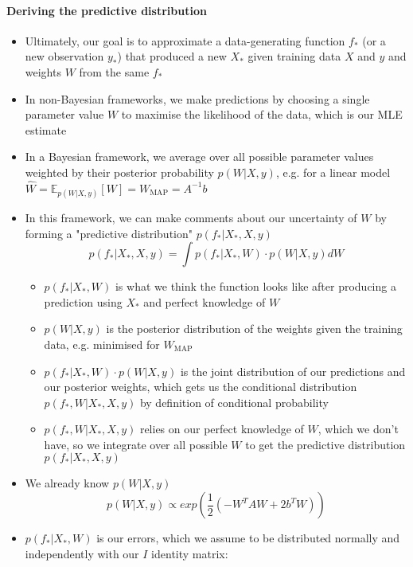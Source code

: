 \documentclass[12pt]{article}
\begin{document}
\paragraph{Deriving the predictive distribution}
\begin{itemize}
    \item Ultimately, our goal is to approximate a data-generating function $f_*$ (or a new observation $y_*$) that produced a new $X_*$ given training data $X$ and $y$ and weights $W$ from the same $f_*$  
    \item In non-Bayesian frameworks, we make predictions by choosing a single parameter value $W$ to maximise the likelihood of the data, which is our MLE estimate
    \item In a Bayesian framework, we average over all possible parameter values weighted by their posterior probability $p(W|X,y)$, e.g. for a linear model $\hat{W} = \mathbb{E}_{p(W|X,y)}[W] = W_\text{MAP} = A^{-1}b$
    \item In this framework, we can make comments about our uncertainty of $W$ by forming a "predictive distribution" $p(f_*|X_*,X,y)$
\begin{equation}
    p(f_*|X_*,X,y) = \int p(f_*|X_*,W) \cdot p(W | X,y)dW
\end{equation}
    \begin{itemize}
        \item $p(f_*|X_*,W)$ is what we think the function looks like after producing a prediction using $X_*$ and perfect knowledge of $W$
        \item $p(W|X,y)$ is the posterior distribution of the weights given the training data, e.g. minimised for $W_\text{MAP}$
        \item $p(f_*|X_*,W) \cdot p(W|X,y)$ is the joint distribution of our predictions and our posterior weights, which gets us the conditional distribution $p(f_*,W|X_*,X,y)$ by definition of conditional probability
        \item $p(f_*,W|X_*,X,y)$ relies on our perfect knowledge of $W$, which we don't have, so we integrate over all possible $W$ to get the predictive distribution $p(f_*|X_*,X,y)$
    \end{itemize}
    \item We already know $p(W|X,y)$
\begin{equation}
    p(W|X,y) \propto exp\left(\frac{1}{2}(-W^TAW + 2b^TW)\right)
\end{equation}
    \item $p(f_*|X_*,W)$ is our errors, which we assume to be distributed normally and independently with our $I$ identity matrix:

\end{itemize}
\end{document}
